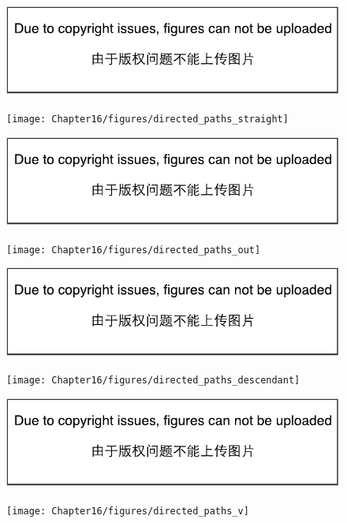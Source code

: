 \begin{figure}[!htb]
\ifOpenSource
\centerline{\includegraphics{figure.pdf}}
\else
	\centerline{\texttt{[image: Chapter16/figures/directed\_paths\_straight]}}	
\fi
\ifOpenSource
\centerline{\includegraphics{figure.pdf}}
\else
	\centerline{\texttt{[image: Chapter16/figures/directed\_paths\_out]}}
\fi
\ifOpenSource
\centerline{\includegraphics{figure.pdf}}
\else
	\centerline{\texttt{[image: Chapter16/figures/directed\_paths\_descendant]}}
\fi
\ifOpenSource
\centerline{\includegraphics{figure.pdf}}
\else
	\centerline{\texttt{[image: Chapter16/figures/directed\_paths\_v]}}		
\fi

\end{figure}
